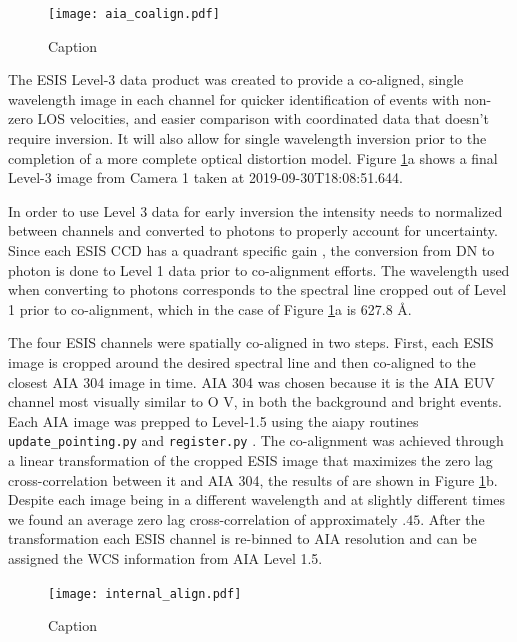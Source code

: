     
   		\begin{figure}
    		\centering
    		\texttt{[image: aia\_coalign.pdf]}
    		\caption{Caption}
    		\label{fig:coalign}
    	\end{figure}
    
    	\newcommand{\levthreetime}{2019-09-30T18:08:51.644}
    	The ESIS Level-3 data product was created to provide a co-aligned, single wavelength image in each channel for quicker identification of events with non-zero LOS velocities, and easier comparison with coordinated data that doesn't require inversion. 
    	It will also allow for single wavelength inversion prior to the completion of a more complete optical distortion model.
    	Figure \ref{fig:coalign}a shows a final Level-3 image from Camera 1 taken at \levthreetime.
    
     	In order to use Level 3 data for early inversion the intensity needs to normalized between channels and converted to photons to properly account for uncertainty.
   		Since each ESIS CCD has a quadrant specific gain \citep{ESIS}, the conversion from DN to photon is done to Level 1 data prior to co-alignment efforts.
   		The wavelength used when converting to photons corresponds to the spectral line cropped out of Level 1 prior to co-alignment, which in the case of Figure \ref{fig:coalign}a is 627.8 \AA.
   		
   		The four ESIS channels were spatially co-aligned in two steps.  
   		First, each ESIS image is cropped around the desired spectral line and then co-aligned to the closest AIA 304 image in time.  
   		AIA 304 was chosen because it is the AIA EUV channel most visually similar to O V, in both the background and bright events.
   		Each AIA image was prepped to Level-1.5 using the aiapy routines \texttt{update\_pointing.py} and \texttt{register.py} \citep{aiapy}.
   		The co-alignment was achieved through a linear transformation of the cropped ESIS image that maximizes the zero lag cross-correlation between it and AIA 304, the results of are shown in Figure \ref{fig:coalign}b.
   		Despite each image being in a different wavelength and at slightly different times we found an average zero lag cross-correlation of approximately $.45$.
   		After the transformation each ESIS channel is re-binned to AIA resolution and can be assigned the WCS information from AIA Level 1.5.

    	\begin{figure}
    		\centering
    		\texttt{[image: internal\_align.pdf]}
			\caption{Caption}
    		\label{fig:cc}	
    	\end{figure}
    
